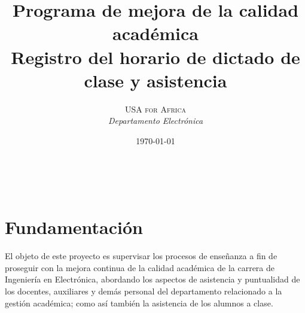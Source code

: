 \documentclass[a4paper, 11pt]{article} %
\title{\textbf{Programa de mejora de la calidad académica}\\ %
Registro del horario de dictado de clase y asistencia} %
\author{\textsc{USA for Africa} %
\\{\textit{Departamento Electrónica}}} %
\date{\today} %
\makeatletter
\renewcommand{\maketitle}{ %
\begin{flushright} %
{\LARGE\@title} %

\vspace{50pt} %

{\large\@author} %
\\\@date %

\vspace{40pt} %
\end{flushright}
}
\makeatother
\begin{document}
\maketitle %







\section*{Fundamentación}
El objeto de este proyecto es supervisar los procesos de enseñanza a fin de proseguir con la mejora continua de la calidad académica de la carrera de Ingeniería en Electrónica, abordando los aspectos de asistencia y puntualidad de los docentes, auxiliares y demás personal del departamento relacionado a la gestión académica; como así también la asistencia de los alumnos a clase. 
\end{document}
